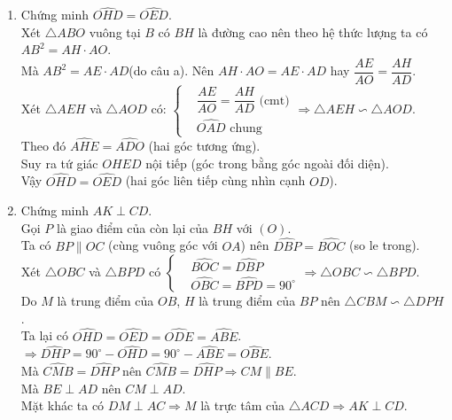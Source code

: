 \begin{ex}
{\begin{enumerate}
\item Chứng minh $ \widehat{OHD}=\widehat{OED}. $\\
Xét $\triangle ABO$ vuông tại $B$ có $BH$ là đường cao nên theo hệ thức lượng ta có $AB^2 = AH \cdot AO$.\\
Mà $AB^2 = AE \cdot AD$\;(do câu a).
Nên $AH \cdot AO = AE \cdot AD$ hay $\dfrac{AE}{AO} = \dfrac{AH}{AD}$.\\
Xét $\triangle AEH$ và $\triangle AOD$ có: $\left\{ \begin{aligned} & \dfrac{AE}{AO} = \dfrac{AH}{AD} \text{ (cmt)}\\ & \widehat{OAD} \text{ chung} 
\end{aligned} \right. \Rightarrow \triangle AEH \backsim \triangle AOD$. \\
Theo đó $\widehat{AHE} = \widehat{ADO}$ (hai góc tương ứng).\\
Suy ra tứ giác $OHED$ nội tiếp\; (góc trong bằng góc ngoài đối diện).\\
Vậy $ \widehat{OHD}=\widehat{OED}$\; (hai góc liên tiếp cùng nhìn cạnh $OD$). 
\item Chứng minh $ AK\perp CD.$\\
Gọi $P$ là giao điểm của còn lại của $BH$ với $(O)$.\\
Ta có $BP \parallel OC$ (cùng vuông góc với $OA$) nên $\widehat{DBP} = \widehat{BOC}$ (so le trong).\\
Xét $\triangle OBC$ và $\triangle BPD$ có $\left\{ \begin{aligned} & \widehat{BOC} = \widehat{DBP} \\ & \widehat{OBC} = \widehat{ BPD} = 90^{\circ} 
\end{aligned} \right. \Rightarrow \triangle OBC \backsim \triangle BPD$.\\
Do $M$ là trung điểm của $OB$, $H$ là trung điểm của $BP$ nên $\triangle CBM \backsim \triangle DPH$.\\
Ta lại có $\widehat{OHD} = \widehat{OED} = \widehat{ODE} = \widehat{ABE}$.\\
$\Rightarrow \widehat{DHP} = 90^{\circ} - \widehat{OHD} = 90^{\circ} - \widehat{ABE} = \widehat{OBE}$.\\ 
Mà $\widehat{CMB} = \widehat{DHP}$ nên $\widehat{CMB} = \widehat{DHP} \Rightarrow CM \parallel BE$.\\
Mà $BE \perp AD$ nên $CM \perp AD$.\\
Mặt khác ta có $DM \perp AC \Rightarrow M$ là trực tâm của $\triangle ACD \Rightarrow AK \perp CD$. 
\end{enumerate}
		}		
	
	
\end{ex}
